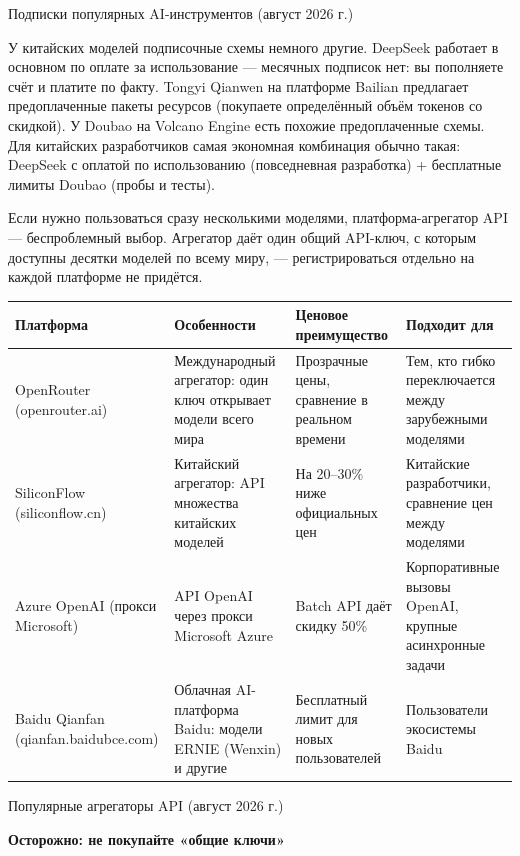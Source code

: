 \begin{center}\small\color{gray}Подписки популярных AI-инструментов (август 2026 г.)\end{center}

У китайских моделей подписочные схемы немного другие. DeepSeek работает в основном по оплате за использование — месячных подписок нет: вы пополняете счёт и платите по факту. Tongyi Qianwen на платформе Bailian предлагает предоплаченные пакеты ресурсов (покупаете определённый объём токенов со скидкой). У Doubao на Volcano Engine есть похожие предоплаченные схемы. Для китайских разработчиков самая экономная комбинация обычно такая: DeepSeek с оплатой по использованию (повседневная разработка) + бесплатные лимиты Doubao (пробы и тесты).


Если нужно пользоваться сразу несколькими моделями, платформа-агрегатор API — беспроблемный выбор. Агрегатор даёт один общий API-ключ, с которым доступны десятки моделей по всему миру, — регистрироваться отдельно на каждой платформе не придётся.

\begin{center}
\begin{tabularx}{\linewidth}{|X|X|X|X|}
\hline
\textbf{Платформа} & \textbf{Особенности} & \textbf{Ценовое преимущество} & \textbf{Подходит для} \tabularnewline
\hline
OpenRouter (openrouter.ai) & Международный агрегатор: один ключ открывает модели всего мира & Прозрачные цены, сравнение в реальном времени & Тем, кто гибко переключается между зарубежными моделями \tabularnewline
SiliconFlow (siliconflow.cn) & Китайский агрегатор: API множества китайских моделей & На 20–30\% ниже официальных цен & Китайские разработчики, сравнение цен между моделями \tabularnewline
Azure OpenAI (прокси Microsoft) & API OpenAI через прокси Microsoft Azure & Batch API даёт скидку 50\% & Корпоративные вызовы OpenAI, крупные асинхронные задачи \tabularnewline
Baidu Qianfan (qianfan.baidubce.com) & Облачная AI-платформа Baidu: модели ERNIE (Wenxin) и другие & Бесплатный лимит для новых пользователей & Пользователи экосистемы Baidu \tabularnewline
\hline
\end{tabularx}
\end{center}

\begin{center}\small\color{gray}Популярные агрегаторы API (август 2026 г.)\end{center}

\textbf{Осторожно: не покупайте «общие ключи»}\par

